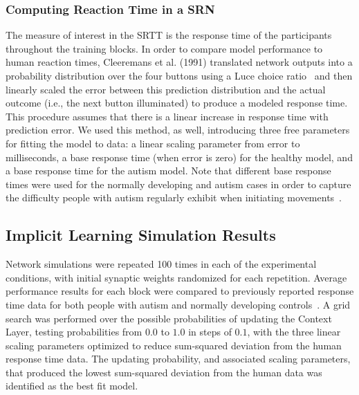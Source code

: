 \subsubsection{Computing Reaction Time in a SRN}
The measure of interest in the SRTT is the response time of the participants throughout the training blocks.  In order to compare model performance to human reaction times, Cleeremans et al. (1991) \nocite{Cleeremans:1991:SSRT} translated network outputs into a probability distribution over the four buttons using a Luce choice ratio~\cite{Luce:1963} and then linearly scaled the error between this prediction distribution and the actual outcome (i.e., the next button illuminated) to produce a modeled response time.  This procedure assumes that there is a linear increase in response time with prediction error.  We used this method, as well, introducing three free parameters for fitting the model to data: a linear scaling parameter from error to milliseconds, a base response time (when error is zero) for the healthy model, and a base response time for the autism model.  Note that different base response times were used for the normally developing and autism cases in order to capture the difficulty people with autism regularly exhibit when initiating
movements~\cite{RefWorks:100}.

\subsection{Implicit Learning Simulation Results}
Network simulations were repeated 100 times in each of the experimental conditions, with initial synaptic weights randomized for each repetition.  Average performance results for each block were compared to previously reported response time data for both people with autism and normally developing controls~\cite{RefWorks:148}.  A grid search was performed over the possible probabilities of updating the Context Layer, testing probabilities from $0.0$ to $1.0$ in steps of $0.1$, with the three linear scaling parameters optimized to reduce sum-squared deviation from the human response time data.  The updating probability, and associated scaling parameters, that produced the lowest sum-squared deviation from the human data was identified as the
best fit model.

